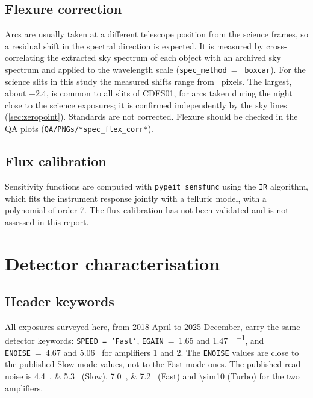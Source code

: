 \documentclass[11pt,a4paper]{article}
\newcommand{\code}[1]{\texttt{#1}}
\begin{document}
\subsection{Flexure correction}
\label{sec:flexure}

Arcs are usually taken at a different telescope position from the science
frames, so a residual shift in the spectral direction is expected. It is measured
by cross-correlating the extracted sky spectrum of each object with an archived
sky spectrum and applied to the wavelength scale (\code{spec\_method}~=~
\code{boxcar}). For the science slits in this study the measured shifts range
from \flexRange{}~pixels. The largest, about \SI{-2.4}{\pixel}, is common to all
slits of CDFS01, for arcs taken during the night close to the science
exposures; it is confirmed independently by the sky lines (\cref{sec:zeropoint}).
Standards are not corrected. Flexure should be checked in the QA plots
(\code{QA/PNGs/*spec\_flex\_corr*}).

\subsection{Flux calibration}
\label{sec:flux}

Sensitivity functions are computed with \code{pypeit\_sensfunc} using the
\code{IR} algorithm, which fits the instrument response jointly with a
telluric model, with a polynomial of order 7. The flux calibration
has not been validated and is not assessed in this report.

\section{Detector characterisation}
\label{sec:detector}

\subsection{Header keywords}

All \nFramesSurvey{} exposures surveyed here, from 2018 April to 2025 December,
carry the same detector keywords: \code{SPEED = 'Fast'},
\code{EGAIN}~=~1.65 and 1.47~\si{\electron\per\adu}, and
\code{ENOISE}~=~4.67 and 5.06~\si{\electron} for amplifiers 1 and 2. The
\code{ENOISE} values are close to the published Slow-mode values, not to the Fast-mode ones. The published
read noise is \SIlist{4.4;5.3}{\electron} (Slow),
\SIlist{7.0;7.2}{\electron} (Fast) and \SI{\sim10}{\electron} (Turbo) for the
two amplifiers.
\end{document}
